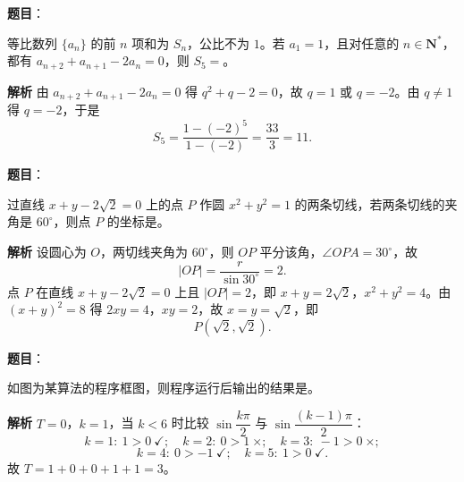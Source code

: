 \begin{answer}

\textbf{题目}：

等比数列 $\{a_n\}$ 的前 $n$ 项和为 $S_n$，公比不为 $1$。若 $a_1=1$，且对任意的 $n\in\mathbf N^*$，都有 $a_{n+2}+a_{n+1}-2a_n=0$，则 $S_5=$\gkblank{}。

\textbf{解析}
由 $a_{n+2}+a_{n+1}-2a_n=0$ 得 $q^2+q-2=0$，故 $q=1$ 或 $q=-2$。由 $q\neq1$ 得 $q=-2$，于是
\nopagebreak[4]
\[S_5=\frac{1-(-2)^5}{1-(-2)}=\frac{33}3=11.\]


\end{answer}
\begin{answer}

\textbf{题目}：

过直线 $x+y-2\sqrt2=0$ 上的点 $P$ 作圆 $x^2+y^2=1$ 的两条切线，若两条切线的夹角是 $60^\circ$，则点 $P$ 的坐标是\gkblank{}。

\textbf{解析}
设圆心为 $O$，两切线夹角为 $60^\circ$，则 $OP$ 平分该角，$\angle OPA=30^\circ$，故
\nopagebreak[4]
\[|OP|=\frac r{\sin30^\circ}=2.\]
点 $P$ 在直线 $x+y-2\sqrt2=0$ 上且 $|OP|=2$，即 $x+y=2\sqrt2$，$x^2+y^2=4$。由 $(x+y)^2=8$ 得 $2xy=4$，$xy=2$，故 $x=y=\sqrt2$，即
\nopagebreak[4]
\[P(\sqrt2,\sqrt2).\]


\end{answer}
\begin{answer}

\textbf{题目}：

如图为某算法的程序框图，则程序运行后输出的结果是\gkblank{}。
\nopagebreak[4]
\begin{center}\end{center}
\nopagebreak[4]
\textbf{解析}
$T=0$，$k=1$，当 $k<6$ 时比较 $\sin\dfrac{k\pi}2$ 与 $\sin\dfrac{(k-1)\pi}2$：
\nopagebreak[4]
\[k=1:\ 1>0\ \checkmark;\quad k=2:\ 0>1\ \times;\quad k=3:\ -1>0\ \times;\]
\nopagebreak[4]
\[k=4:\ 0>-1\ \checkmark;\quad k=5:\ 1>0\ \checkmark.\]
故 $T=1+0+0+1+1=3$。


\end{answer}
